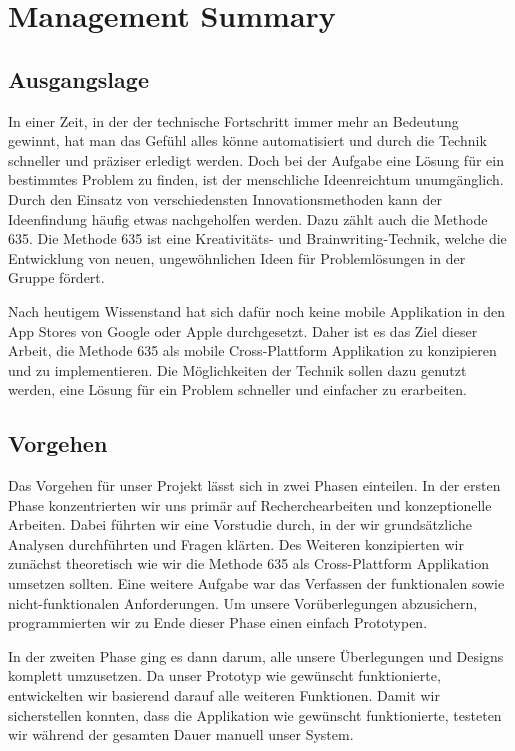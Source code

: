\section{Management Summary}

\subsection{Ausgangslage}
In einer Zeit, in der der technische Fortschritt immer mehr an Bedeutung gewinnt, hat man das Gefühl alles könne automatisiert und durch die Technik schneller und präziser erledigt werden. Doch bei der Aufgabe eine Lösung für ein bestimmtes Problem zu finden, ist der menschliche Ideenreichtum unumgänglich. Durch den Einsatz von verschiedensten Innovationsmethoden kann der Ideenfindung häufig etwas nachgeholfen werden. Dazu zählt auch die Methode 635. Die Methode 635 ist eine Kreativitäts- und Brainwriting-Technik, welche die Entwicklung von neuen, ungewöhnlichen Ideen für Problemlösungen in der Gruppe fördert.

Nach heutigem Wissenstand hat sich dafür noch keine mobile Applikation in den App Stores von Google oder Apple durchgesetzt. Daher ist es das Ziel dieser Arbeit, die Methode 635 als mobile Cross-Plattform Applikation zu konzipieren und zu implementieren. Die Möglichkeiten der Technik sollen dazu genutzt werden, eine Lösung für ein Problem schneller und einfacher zu erarbeiten.

\subsection{Vorgehen}
Das Vorgehen für unser Projekt lässt sich in zwei Phasen einteilen. In der ersten Phase konzentrierten wir uns primär auf Recherchearbeiten und konzeptionelle Arbeiten. Dabei führten wir eine Vorstudie durch, in der wir grundsätzliche Analysen durchführten und Fragen klärten. Des Weiteren konzipierten wir zunächst theoretisch wie wir die Methode 635 als Cross-Plattform Applikation umsetzen sollten. Eine weitere Aufgabe war das Verfassen der funktionalen sowie nicht-funktionalen Anforderungen. Um unsere Vorüberlegungen abzusichern, programmierten wir zu Ende dieser Phase einen einfach Prototypen.

In der zweiten Phase ging es dann darum, alle unsere Überlegungen und Designs komplett umzusetzen. Da unser Prototyp wie gewünscht funktionierte, entwickelten wir basierend darauf alle weiteren Funktionen. Damit wir sicherstellen konnten, dass die Applikation wie gewünscht funktionierte, testeten wir während der gesamten Dauer manuell unser System.


